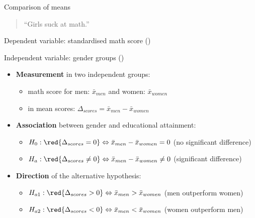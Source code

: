 \documentclass{beamer}
\begin{document}
	\begin{frame}[t]{Comparison of means }
					
		\begin{quote}
		``Girls suck at math.''
		\end{quote}
		
		Dependent variable:  standardised math score ()

		Independent variable:  gender groups ()

		\begin{itemize}
			\item \textbf{Measurement} in two independent groups:

				\begin{itemize}
					\item {} math score for men: $\bar{x}_{men}$ and women: $\bar{x}_{women}$
					\item {} in mean scores: $\Delta_{scores} = \bar{x}_{men} - \bar{x}_{women}$
				\end{itemize}

			\item \textbf{Association} between gender and educational attainment:
									
				\begin{itemize}
					\item $H_0: \red{\Delta_{scores} = 0} \Leftrightarrow \bar{x}_{men} - \bar{x}_{women} = 0$ (no significant difference)
					\item $H_a: \red{\Delta_{scores} \neq 0} \Leftrightarrow \bar{x}_{men} - \bar{x}_{women} \neq 0$ (significant difference)
				\end{itemize}
			
			\item \textbf{Direction} of the alternative hypothesis: 
						
				\begin{itemize}
					\item $H_{a1}: \red{\Delta_{scores} > 0} \Leftrightarrow  \bar{x}_{men} > \bar{x}_{women}$ (men outperform women)
					\item $H_{a2}: \red{\Delta_{scores} < 0} \Leftrightarrow  \bar{x}_{men} < \bar{x}_{women}$ (women outperform men)
				\end{itemize}
		\end{itemize}

	\end{frame}	
\end{document}

